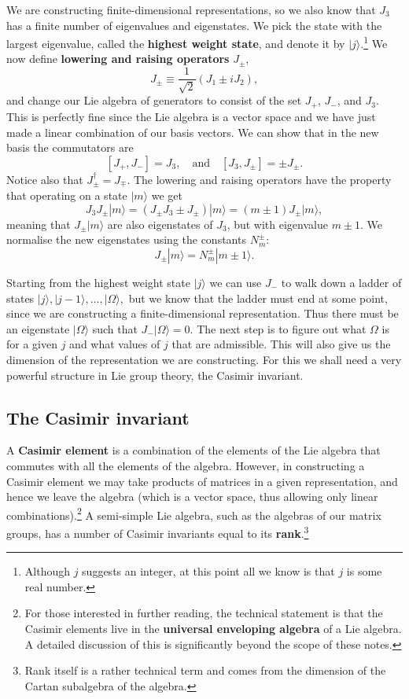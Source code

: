 \documentclass[notes.tex]{subfiles}
\begin{document}
We are constructing finite-dimensional representations, so we also know that $J_3$ has a finite number of eigenvalues and eigenstates. We pick the state with the largest eigenvalue, called the {\bf highest weight state}, and denote it by $|j\rangle$.\footnote{Although $j$ suggests an integer, at this point all we know is that $j$ is some real number.} We now define {\bf lowering and raising operators} $J_\pm$,
\[ J_\pm \equiv\frac{1}{\sqrt{2}}(J_1\pm i J_2), \]
and change our Lie algebra of generators to consist of the set $J_+$, $J_-$, and $J_3$. This is perfectly fine since the Lie algebra is a vector space and  we have just made a linear combination of our basis vectors. We can show that in the new basis the commutators are
\[ [J_+, J_-]=J_3,\quad\text{and}\quad [J_3,J_\pm]=\pm J_\pm. \]
Notice also that $J_\pm^\dagger=J_\mp$. 
The lowering and raising operators have the property that operating on a state $|m\rangle$ we get 
\[ J_3J_\pm |m\rangle=(J_\pm J_3\pm J_\pm)|m\rangle=(m\pm1)J_\pm|m\rangle, \]
meaning that $J_\pm |m\rangle$ are also eigenstates of $J_3$, but with eigenvalue $m\pm1$. 
We normalise the new eigenstates using the constants $N_m^\pm$:
\[ J_\pm|m\rangle = N_m^\pm |m\pm1\rangle. \]

Starting from the highest weight state $|j\rangle$ we can use $J_-$ to walk down a ladder of states
$|j\rangle, |j-1\rangle,\ldots,|\Omega\rangle,$ but we know that the ladder must end at some point, since we are constructing a finite-dimensional representation. Thus there must be an eigenstate $|\Omega\rangle$ such that
$J_-|\Omega\rangle=0$.
The next step is to figure out what $\Omega$ is for a given $j$ and what values of $j$ that are admissible. This will also give us the dimension of the representation we are constructing. For this we shall need a very powerful structure in Lie group theory, the Casimir invariant.


\subsection{The Casimir invariant}
A {\bf Casimir element} is a combination of the elements of the Lie algebra that commutes with all the elements of the algebra. However, in constructing a Casimir element we may take products of matrices in a given representation, and hence we leave the algebra (which is a vector space, thus allowing only linear combinations).\footnote{For those interested in further reading, the technical statement is that the Casimir elements live in the {\bf universal enveloping algebra} of a Lie algebra. A detailed discussion of this is significantly beyond the scope of these notes.}
A semi-simple Lie algebra, such as the algebras of our matrix groups, has a number of Casimir invariants equal to its {\bf rank}.\footnote{Rank itself is a rather technical term and comes from the dimension of the Cartan subalgebra of the algebra.} 
\end{document}
